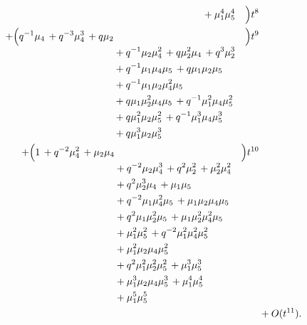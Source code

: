 \documentclass[10pt]{article}
\begin{document}
\[\begin{aligned}
\begin{aligned}[t]
  &{}+\mu_{1}^{4}\mu_{5}^{4}\end{aligned}\Bigr)t^{8} \\
  + \Bigl(\begin{aligned}[t]q^{-1}\mu_{4}\,+q^{-3}\mu_{4}^{3}\,+q\mu_{2} \\
  &{}+q^{-1}\mu_{2}\mu_{4}^{2}\,+q\mu_{2}^{2}\mu_{4}\,+q^{3}\mu_{2}^{3} \\
  &{}+q^{-1}\mu_{1}\mu_{4}\mu_{5}\,+q\mu_{1}\mu_{2}\mu_{5} \\
  &{}+q^{-1}\mu_{1}\mu_{2}\mu_{4}^{2}\mu_{5} \\
  &{}+q\mu_{1}\mu_{2}^{2}\mu_{4}\mu_{5}\,+q^{-1}\mu_{1}^{2}\mu_{4}\mu_{5}^{2} \\
  &{}+q\mu_{1}^{2}\mu_{2}\mu_{5}^{2}\,+q^{-1}\mu_{1}^{3}\mu_{4}\mu_{5}^{3} \\
  &{}+q\mu_{1}^{3}\mu_{2}\mu_{5}^{3}\end{aligned}\Bigr)t^{9} \\
  + \Bigl(\begin{aligned}[t]1\,+q^{-2}\mu_{4}^{2}\,+\mu_{2}\mu_{4} \\
  &{}+q^{-2}\mu_{2}\mu_{4}^{3}\,+q^{2}\mu_{2}^{2}\,+\mu_{2}^{2}\mu_{4}^{2} \\
  &{}+q^{2}\mu_{2}^{3}\mu_{4}\,+\mu_{1}\mu_{5} \\
  &{}+q^{-2}\mu_{1}\mu_{4}^{2}\mu_{5}\,+\mu_{1}\mu_{2}\mu_{4}\mu_{5} \\
  &{}+q^{2}\mu_{1}\mu_{2}^{2}\mu_{5}\,+\mu_{1}\mu_{2}^{2}\mu_{4}^{2}\mu_{5} \\
  &{}+\mu_{1}^{2}\mu_{5}^{2}\,+q^{-2}\mu_{1}^{2}\mu_{4}^{2}\mu_{5}^{2} \\
  &{}+\mu_{1}^{2}\mu_{2}\mu_{4}\mu_{5}^{2} \\
  &{}+q^{2}\mu_{1}^{2}\mu_{2}^{2}\mu_{5}^{2}\,+\mu_{1}^{3}\mu_{5}^{3} \\
  &{}+\mu_{1}^{3}\mu_{2}\mu_{4}\mu_{5}^{3}\,+\mu_{1}^{4}\mu_{5}^{4} \\
  &{}+\mu_{1}^{5}\mu_{5}^{5}\end{aligned}\Bigr)t^{10} \\
  &+ O(t^{11}).
\end{aligned}
\]
\end{document}

